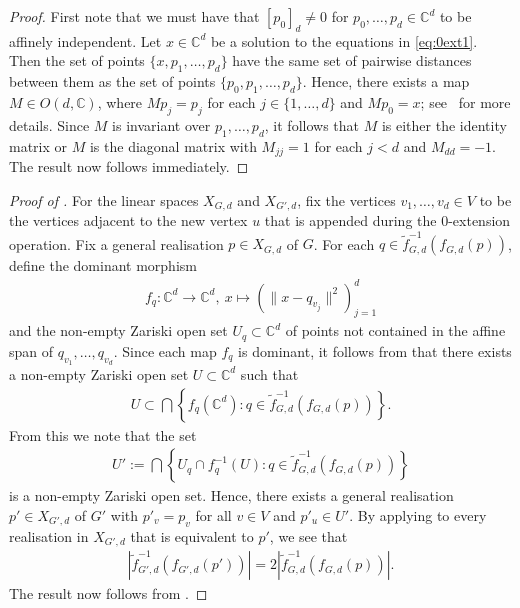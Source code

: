 \documentclass[ALCO]{cedram}
\begin{document}
\begin{proof}
	First note that we must have that $[p_0]_d \neq 0$ for $p_0,\ldots,p_d \in \mathbb{C}^d$ to be affinely independent.
	Let $x \in \mathbb{C}^d$ be a solution to the equations in \eqref{eq:0ext1}.
	Then the set of points $\{x,p_1,\ldots,p_d\}$ have the same set of pairwise distances between them as the set of points $\{p_0,p_1,\ldots,p_d\}$.
	Hence, there exists a map $M \in O(d,\mathbb{C})$, where $Mp_j=p_j$ for each $j \in \{1,\ldots,d\}$ and $Mp_0 = x$;
	see~\cite[Section 10]{Gortler2014} for more details.
	Since $M$ is invariant over $p_1,\ldots,p_d$, it follows that $M$ is either the identity matrix or $M$ is the diagonal matrix with $M_{jj}=1$ for each $j<d$ and $M_{dd}=-1$.
	The result now follows immediately.
\end{proof}




\begin{proof}[Proof of ]
	For the linear spaces $X_{G,d}$ and $X_{G',d}$,
	fix the vertices $v_1,\ldots,v_d \in V$ to be the vertices adjacent to the new vertex $u$ that is appended during the 0-extension operation.
	Fix a general realisation $p \in X_{G,d}$ of $G$.
	For each $q \in \tilde{f}_{G,d}^{-1}(f_{G,d}(p))$,
	define the dominant morphism
	\begin{align*}
		f_q : \mathbb{C}^d \rightarrow \mathbb{C}^d, ~ x \mapsto \left(\|x - q_{v_j}\|^2\right)_{j =1}^d
	\end{align*}
	and the non-empty Zariski open set $U_q \subset \mathbb{C}^d$ of points not contained in the affine span of $q_{v_1},\ldots,q_{v_d}$.
	Since each map $f_q$ is dominant,
	it follows from  that there exists a non-empty Zariski open set $U \subset \mathbb{C}^d$ such that 
	\begin{align*}
		U \subset \bigcap \left\{ f_q(\mathbb{C}^d) : q \in \tilde{f}_{G,d}^{-1}(f_{G,d}(p)) \right\}.
	\end{align*}
	From this we note that the set
	\begin{align*}
		U' := \bigcap \left\{ U_q \cap f_q^{-1}(U) : q \in \tilde{f}_{G,d}^{-1}(f_{G,d}(p)) \right\}
	\end{align*}
	is a non-empty Zariski open set.
	Hence, there exists a general realisation $p' \in X_{G',d}$ of $G'$ with $p'_v=p_v$ for all $v \in V$ and $p'_u \in U'$.
	By applying  to every realisation in $X_{G',d}$ that is equivalent to $p'$,
	we see that
	\begin{align*}
		\left|\tilde{f}_{G',d}^{-1}\left(f_{G',d}(p') \right) \right| = 2\left|\tilde{f}_{G,d}^{-1}\left(f_{G,d}(p) \right) \right|.
	\end{align*}
	The result now follows from .
\end{proof}



\end{document}
